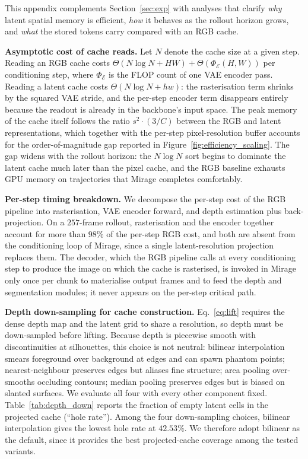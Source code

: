 \documentclass{llmxive}
\providecommand{\method}{Mirage\xspace}
\providecommand{\boldstart}[1]{\vspace{0.1in}\noindent\textbf{#1}}
\begin{document}
This appendix complements Section~\ref{sec:exp} with analyses that clarify \emph{why} latent spatial memory is efficient, \emph{how} it behaves as the rollout horizon grows, and \emph{what} the stored tokens carry compared with an RGB cache.

\boldstart{Asymptotic cost of cache reads.}
Let $N$ denote the cache size at a given step.
Reading an RGB cache costs $\Theta(N \log N + HW) + \Theta(\Phi_\mathcal{E}(H, W))$ per conditioning step, where $\Phi_\mathcal{E}$ is the FLOP count of one VAE encoder pass.
Reading a latent cache costs $\Theta(N \log N + hw)$: the rasterisation term shrinks by the squared VAE stride, and the per-step encoder term disappears entirely because the readout is already in the backbone's input space.
The peak memory of the cache itself follows the ratio $s^2 \cdot (3 / C)$ between the RGB and latent representations, which together with the per-step pixel-resolution buffer accounts for the order-of-magnitude gap reported in Figure~\ref{fig:efficiency_scaling}.
The gap widens with the rollout horizon: the $N \log N$ sort begins to dominate the latent cache much later than the pixel cache, and the RGB baseline exhausts GPU memory on trajectories that \method{} completes comfortably.

\boldstart{Per-step timing breakdown.}
We decompose the per-step cost of the RGB pipeline into rasterisation, VAE encoder forward, and depth estimation plus back-projection.
On a $257$-frame rollout, rasterisation and the encoder together account for more than $98\%$ of the per-step RGB cost, and both are absent from the conditioning loop of \method{}, since a single latent-resolution projection replaces them.
The decoder, which the RGB pipeline calls at every conditioning step to produce the image on which the cache is rasterised, is invoked in \method{} only once per chunk to materialise output frames and to feed the depth and segmentation modules; it never appears on the per-step critical path.

\boldstart{Depth down-sampling for cache construction.}
Eq.~\ref{eq:lift} requires the dense depth map and the latent grid to share a resolution, so depth must be down-sampled before lifting.
Because depth is piecewise smooth with discontinuities at silhouettes, this choice is not neutral: bilinear interpolation smears foreground over background at edges and can spawn phantom points; nearest-neighbour preserves edges but aliases fine structure; area pooling over-smooths occluding contours; median pooling preserves edges but is biased on slanted surfaces.
We evaluate all four with every other component fixed.
Table~\ref{tab:depth_down} reports the fraction of empty latent cells in the projected cache (``hole rate'').
Among the four down-sampling choices, bilinear interpolation gives the lowest hole rate at $42.53\%$.
We therefore adopt bilinear as the default, since it provides the best projected-cache coverage among the tested variants.
\end{document}
